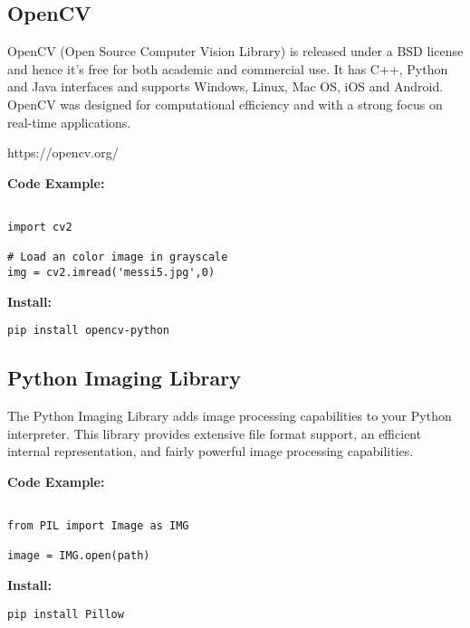 \subsection{OpenCV}

OpenCV (Open Source Computer Vision Library) is released under a BSD license and hence it’s
free for both academic and commercial use. It has C++, Python and Java interfaces and
supports Windows, Linux, Mac OS, iOS and Android. OpenCV was designed for computational 
efficiency and with a strong focus on real-time applications.\cite{hid-sp18-414-www-OpenCV}

https://opencv.org/

\bigskip
\noindent
\textbf{Code Example:}
\begin{footnotesize}
\begin{verbatim}

import cv2

# Load an color image in grayscale
img = cv2.imread('messi5.jpg',0)

\end{verbatim}
\end{footnotesize}
\noindent
\textbf{Install:}
\begin{footnotesize}
\begin{verbatim}
pip install opencv-python
\end{verbatim}
\end{footnotesize}

\subsection{Python Imaging Library}

The Python Imaging Library adds image processing capabilities 
to your Python interpreter. This library provides extensive file 
format support, an efficient internal representation, and fairly 
powerful image processing capabilities.\cite{hid-sp18-414-www-Pillow}


\bigskip
\noindent
\textbf{Code Example:}
\begin{footnotesize}
\begin{verbatim}

from PIL import Image as IMG

image = IMG.open(path)

\end{verbatim}
\end{footnotesize}
\noindent
\textbf{Install:}
\begin{footnotesize}
\begin{verbatim}
pip install Pillow
\end{verbatim}
\end{footnotesize}


